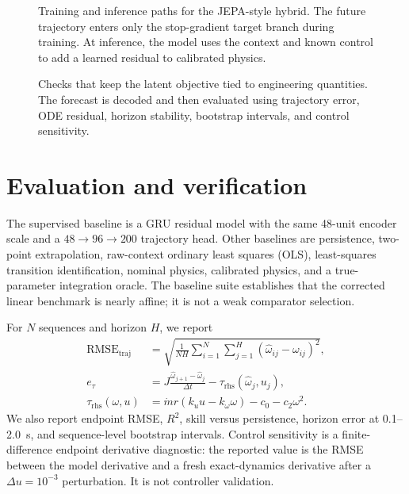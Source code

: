 \documentclass[10pt,journal]{IEEEtran}
\begin{document}
\begin{figure}[!t]
 \centering
 \resizebox{0.96\textwidth}{!}{}
 \caption{Training and inference paths for the JEPA-style hybrid. The future trajectory enters only the stop-gradient target branch during training. At inference, the model uses the context and known control to add a learned residual to calibrated physics.}
 \label{fig:jepa}
\end{figure}

\begin{figure}[!t]
 \centering
 \resizebox{0.96\textwidth}{!}{}
 \caption{Checks that keep the latent objective tied to engineering quantities. The forecast is decoded and then evaluated using trajectory error, ODE residual, horizon stability, bootstrap intervals, and control sensitivity.}
 \label{fig:transparency}
\end{figure}

\section{Evaluation and verification}
The supervised baseline is a GRU residual model with the same 48-unit encoder scale and a $48\rightarrow96\rightarrow200$ trajectory head. Other baselines are persistence, two-point extrapolation, raw-context ordinary least squares (OLS), least-squares transition identification, nominal physics, calibrated physics, and a true-parameter integration oracle. The baseline suite establishes that the corrected linear benchmark is nearly affine; it is not a weak comparator selection.

For $N$ sequences and horizon $H$, we report
\begin{equation}
  \begin{aligned}
  \mathrm{RMSE}_{\mathrm{traj}}&=\sqrt{\frac{1}{NH}\sum_{i=1}^{N}\sum_{j=1}^{H}
  (\hat\omega_{ij}-\omega_{ij})^2},\\
  e_\tau&=J\frac{\hat\omega_{j+1}-\hat\omega_j}{\Delta t}
  -\tau_{\mathrm{rhs}}(\hat\omega_j,u_j),\\
  \tau_{\mathrm{rhs}}(\omega,u)&=\dot m r(k_u u-k_\omega\omega)-c_0-c_2\omega^2.
  \end{aligned}
\end{equation}
We also report endpoint RMSE, $R^2$, skill versus persistence, horizon error at 0.1--2.0~s, and sequence-level bootstrap intervals. Control sensitivity is a finite-difference endpoint derivative diagnostic: the reported value is the RMSE between the model derivative and a fresh exact-dynamics derivative after a $\Delta u=10^{-3}$ perturbation. It is not controller validation.
\end{document}
